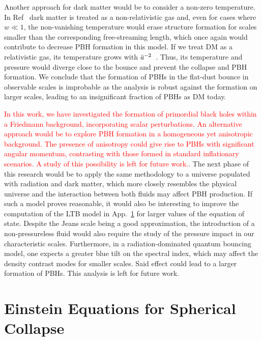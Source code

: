 \documentclass[a4paper,11pt]{article}
\begin{document}
Another approach for dark matter would be to consider a non-zero temperature. In Ref~\cite{Armendariz2014} dark matter is treated as a non-relativistic gas and, even for cases where $w\ll1$, the non-vanishing temperature would erase structure formation for scales smaller than the corresponding free-streaming length, which once again would contribute to decrease PBH formation in this model. If we treat DM as a relativistic gas, its temperature grows with $\Bar{a}^{-2}$~\cite{Mukhanov1992}. Thus, its temperature and pressure would diverge close to the bounce and prevent the collapse and PBH formation. We conclude that the formation of PBHs in the flat-dust bounce in observable scales is improbable as the analysis is robust against the formation on larger scales, leading to an insignificant fraction of PBHs as DM today.

\textcolor{red}{In this work, we have investigated the formation of primordial black holes within a Friedmann background, incorporating scalar perturbations. An alternative approach would be to explore PBH formation in a homogeneous yet anisotropic background. The presence of anisotropy could give rise to PBHs with significant angular momentum, contrasting with those formed in standard inflationary scenarios. A study of this possibility is left for future work.}. The next phase of this research would be to apply the same methodology to a universe populated with radiation and dark matter, which more closely resembles the physical universe and the interaction between both fluids may affect PBH production. If such a model proves reasonable, it would also be interesting to improve the computation of the LTB model in App.~\ref{appc} for larger values of the equation of state. Despite the Jeans scale being a good approximation, the introduction of a non-pressureless fluid would also require the study of the pressure impact in our characteristic scales. Furthermore, in a radiation-dominated quantum bouncing model, one expects a greater blue tilt on the spectral index, which may affect the density contrast modes for smaller scales. Said effect could lead to a larger formation of PBHs. This analysis is left for future work. 




\appendix

\section{Einstein Equations for Spherical Collapse}
\label{appc}
\end{document}

